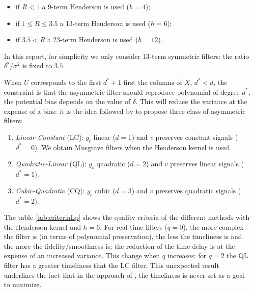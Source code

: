 \documentclass[
  12pt,
  ,
  a4paper]{article}
\newcommand\1{\mathds{1}}
\begin{document}
\begin{itemize}
\item
  if \(R<1\) a 9-term Henderson is used (\(h=4\));
\item
  if \(1\leq R\leq3.5\) a 13-term Henderson is used (\(h=6\));
\item
  if \(3.5< R\) a 23-term Henderson is used (\(h=12\)).
\end{itemize}

In this report, for simplicity we only consider 13-term symmetric filters: the ratio \(\delta^2/\sigma^2\) is fixed to \(3.5\).

When \(U\) corresponds to the first \(d^*+1\) first the columns of \(X\), \(d^*<d\), the constraint is that the asymmetric filter should reproduce polynomial of degree \(d^*\), the potential bias depends on the value of \(\delta\).
This will reduce the variance at the expense of a bias: it is the idea followed by \textcite{proietti2008} to propose three class of asymmetric filters:

\begin{enumerate}
\def\labelenumi{\arabic{enumi}.}
\item
  \emph{Linear-Constant} (LC): \(y_t\) linear (\(d=1\)) and \(v\) preserves constant signals (\(d^*=0\)).
  We obtain Musgrave filters when the Henderson kernel is used.
\item
  \emph{Quadratic-Linear} (QL): \(y_t\) quadratic (\(d=2\)) and \(v\) preserves linear signals (\(d^*=1\)).
\item
  \emph{Cubic-Quadratic} (CQ): \(y_t\) cubic (\(d=3\)) and \(v\) preserves quadratic signals (\(d^*=2\)).
\end{enumerate}

The table \ref{tab:criteriaLp} shows the quality criteria of the different methods with the Henderson kernel and \(h=6\).
For real-time filters (\(q=0\)), the more complex the filter is (in terms of polynomial preservation), the less the timeliness is and the more the fidelity/smoothness is: the reduction of the time-delay is at the expense of an increased variance.
This change when \(q\) increases: for \(q=2\) the QL filter has a greater timeliness that the LC filter.
This unexpected result underlines the fact that in the approach of \textcite{proietti2008}, the timeliness is never set as a goal to minimize.
\end{document}
